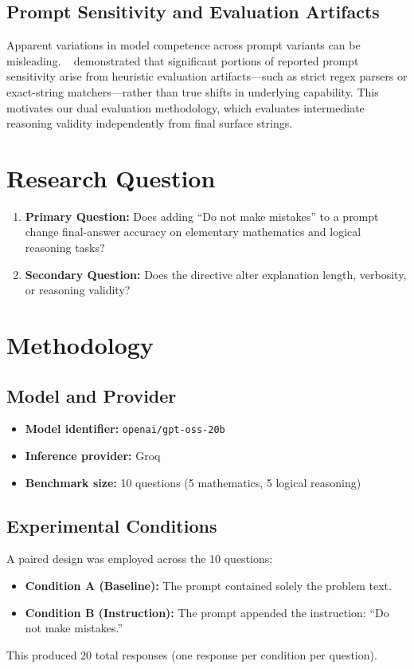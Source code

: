 \documentclass[11pt,a4paper]{article}
\begin{document}
\subsection{Prompt Sensitivity and Evaluation Artifacts}
Apparent variations in model competence across prompt variants can be
misleading. \citeauthor{hua2025}~\cite{hua2025} demonstrated that significant
portions of reported prompt sensitivity arise from heuristic evaluation
artifacts—such as strict regex parsers or exact-string matchers—rather than true
shifts in underlying capability. This motivates our dual evaluation methodology,
which evaluates intermediate reasoning validity independently from final surface strings.

\section{Research Question}

\begin{enumerate}[leftmargin=*]
    \item \textbf{Primary Question:} Does adding ``Do not make mistakes'' to a prompt
    change final-answer accuracy on elementary mathematics and logical reasoning tasks?
    \item \textbf{Secondary Question:} Does the directive alter explanation length,
    verbosity, or reasoning validity?
\end{enumerate}

\section{Methodology}

\subsection{Model and Provider}
\begin{itemize}[leftmargin=*]
    \item \textbf{Model identifier:} \texttt{openai/gpt-oss-20b}
    \item \textbf{Inference provider:} Groq
    \item \textbf{Benchmark size:} 10 questions (5 mathematics, 5 logical reasoning)
\end{itemize}

\subsection{Experimental Conditions}
A paired design was employed across the 10 questions:
\begin{itemize}[leftmargin=*]
    \item \textbf{Condition A (Baseline):} The prompt contained solely the problem text.
    \item \textbf{Condition B (Instruction):} The prompt appended the instruction:
    ``Do not make mistakes.''
\end{itemize}
This produced 20 total responses (one response per condition per question).
\end{document}
